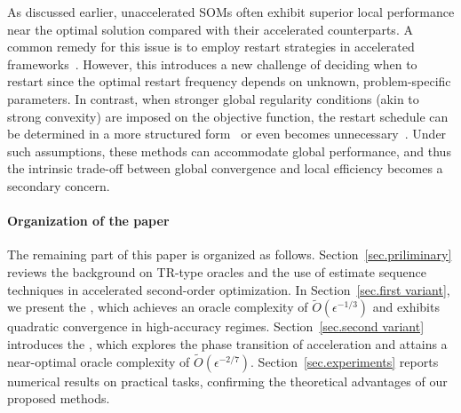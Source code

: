 As discussed earlier, unaccelerated SOMs often exhibit superior local performance near the optimal solution compared with their accelerated counterparts. A common remedy for this issue is to employ restart strategies in accelerated frameworks~\cite{nesterov_lectures_2018}. However, this introduces a new challenge of deciding when to restart since the optimal restart frequency depends on unknown, problem-specific parameters. In contrast, when stronger global regularity conditions (akin to strong convexity) are imposed on the objective function, the restart schedule can be determined in a more structured form~\cite{ostroukhov2020tensor, lin2025perseus, huang2025approximation} or even becomes unnecessary~\cite{jiang2022generalized, marques2022variants}. Under such assumptions, these methods can accommodate global performance, and thus the intrinsic trade-off between global convergence and local efficiency becomes a secondary concern.

\paragraph{Organization of the paper}
The remaining part of this paper is organized as follows. Section~\ref{sec.priliminary} reviews the background on TR-type oracles and the use of estimate sequence techniques in accelerated second-order optimization. In Section~\ref{sec.first variant}, we present the , which achieves an oracle complexity of $\tilde O(\epsilon^{-1/3})$ and exhibits quadratic convergence in high-accuracy regimes. Section~\ref{sec.second variant} introduces the , which explores the phase transition of acceleration and attains a near-optimal oracle complexity of $\tilde O(\epsilon^{-2/7})$. Section~\ref{sec.experiments} reports numerical results on practical tasks, confirming the theoretical advantages of our proposed methods.